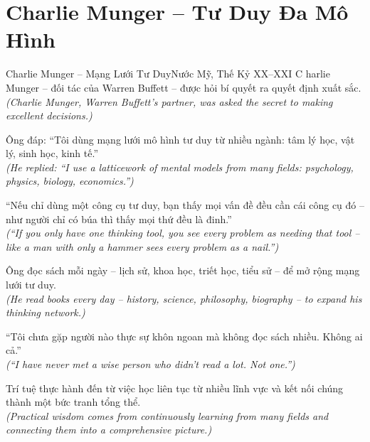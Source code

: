 \section{Charlie Munger -- Tư Duy Đa Mô Hình}
\begin{truyen}{Charlie Munger -- Mạng Lưới Tư Duy}{Nước Mỹ, Thế Kỷ XX--XXI}
C harlie Munger -- đối tác của Warren Buffett -- được hỏi bí quyết ra quyết định xuất sắc.\\
\textit{(Charlie Munger, Warren Buffett's partner, was asked the secret to making excellent decisions.)}

Ông đáp: ``Tôi dùng mạng lưới mô hình tư duy từ nhiều ngành: tâm lý học, vật lý, sinh học, kinh tế.''\\
\textit{(He replied: ``I use a latticework of mental models from many fields: psychology, physics, biology, economics.'')}

``Nếu chỉ dùng một công cụ tư duy, bạn thấy mọi vấn đề đều cần cái công cụ đó -- như người chỉ có búa thì thấy mọi thứ đều là đinh.''\\
\textit{(``If you only have one thinking tool, you see every problem as needing that tool -- like a man with only a hammer sees every problem as a nail.'')}

Ông đọc sách mỗi ngày -- lịch sử, khoa học, triết học, tiểu sử -- để mở rộng mạng lưới tư duy.\\
\textit{(He read books every day -- history, science, philosophy, biography -- to expand his thinking network.)}

``Tôi chưa gặp người nào thực sự khôn ngoan mà không đọc sách nhiều. Không ai cả.''\\
\textit{(``I have never met a wise person who didn't read a lot. Not one.'')}

\end{truyen}
\begin{baihoc}
  Trí tuệ thực hành đến từ việc học liên tục từ nhiều lĩnh vực và kết nối chúng thành một bức tranh tổng thể.\\
  \textit{(Practical wisdom comes from continuously learning from many fields and connecting them into a comprehensive picture.)}
\end{baihoc}

